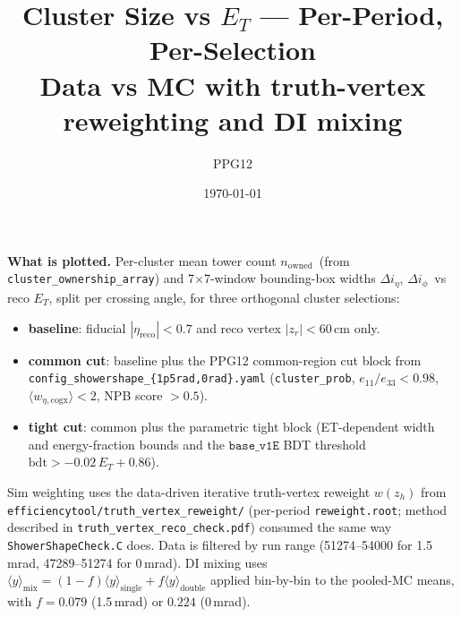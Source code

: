 \documentclass[11pt,a4paper]{article}
\title{Cluster Size vs $E_T$ --- Per-Period, Per-Selection\\[-2pt]
\large Data vs MC with truth-vertex reweighting and DI mixing}
\author{PPG12}
\date{\today}
\newcommand{\nown}{$n_{\mathrm{owned}}$}
\newcommand{\dietag}{$\Delta i_\eta$}
\newcommand{\diphig}{$\Delta i_\phi$}
\begin{document}
\maketitle
\vspace{-1.5em}

\noindent
\textbf{What is plotted.}  Per-cluster mean tower count \nown\ (from
\texttt{cluster\_ownership\_array}) and 7$\times$7-window bounding-box
widths \dietag, \diphig\ vs reco $E_T$, split per crossing angle, for
three orthogonal cluster selections:
\begin{itemize}
\item \textbf{baseline}: fiducial $|\eta_{\mathrm{reco}}|<0.7$ and reco
  vertex $|z_r|<60$\,cm only.
\item \textbf{common cut}: baseline plus the PPG12 common-region cut
  block from \texttt{config\_showershape\_\{1p5rad,0rad\}.yaml}
  (\texttt{cluster\_prob}, $e_{11}/e_{33}<0.98$, $\langle
  w_{\eta,\mathrm{cogx}}\rangle<2$, NPB score $>0.5$).
\item \textbf{tight cut}: common plus the parametric tight block
  (ET-dependent width and energy-fraction bounds and the
  $\mathtt{base\_v1E}$ BDT threshold
  $\mathrm{bdt}>-0.02\,E_T + 0.86$).
\end{itemize}
Sim weighting uses the data-driven iterative truth-vertex reweight
$w(z_h)$ from \texttt{efficiencytool/truth\_vertex\_reweight/} (per-period
\texttt{reweight.root}; method described in
\texttt{truth\_vertex\_reco\_check.pdf}) consumed the same way
\texttt{ShowerShapeCheck.C} does.  Data is filtered by run range
(51274--54000 for 1.5\,mrad, 47289--51274 for 0\,mrad).
DI mixing uses $\langle y\rangle_{\mathrm{mix}} = (1-f)\langle
y\rangle_{\mathrm{single}}+f\langle y\rangle_{\mathrm{double}}$
applied bin-by-bin to the pooled-MC means, with $f=0.079$ (1.5\,mrad)
or $0.224$ (0\,mrad).
\end{document}
